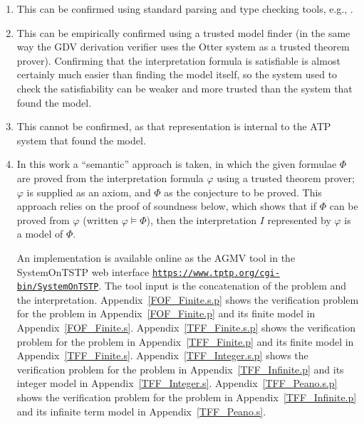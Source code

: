 \documentclass{easychair}
\newcommand{\smalltt}[1]{\small \texttt{#1}}
\begin{document}
\begin{enumerate}
\item This can be confirmed using standard parsing and type checking tools, e.g., \cite{VS06,HR15}.
\item This can be empirically confirmed using a trusted model finder (in the same way the GDV 
      derivation verifier \cite{Sut06} uses the Otter system \cite{McC03-Otter} as a trusted 
      theorem prover).
      Confirming that the interpretation formula is satisfiable is almost certainly much 
      easier than finding the model itself, so the system used to check the satisfiability can 
      be weaker and more trusted than the system that found the model.
\item This cannot be confirmed, as that representation is internal to the ATP system that found
      the model.
\item In this work a ``semantic'' approach is taken, in which the given formulae $\Phi$ are proved 
      from the interpretation formula $\varphi$ using a trusted theorem prover; $\varphi$ is 
      supplied as an axiom, and $\Phi$ as the conjecture to be proved.
      This approach relies on the proof of soundness below, which shows that if $\Phi$ can be 
      proved from $\varphi$ (written $\varphi \models \Phi$), then the interpretation $I$ 
      represented by $\varphi$ is a model of $\Phi$.

      An implementation is available online as the AGMV tool in the SystemOnTSTP \cite{Sut07-CSR} 
      web interface {\smalltt{\url{https://www.tptp.org/cgi-bin/SystemOnTSTP}}}.
      The tool input is the concatenation of the problem and the interpretation.
      Appendix~\ref{FOF_Finite.s.p} shows the verification problem for the problem in 
      Appendix~\ref{FOF_Finite.p} and its finite model in Appendix~\ref{FOF_Finite.s}.
      Appendix~\ref{TFF_Finite.s.p} shows the verification problem for the problem in 
      Appendix~\ref{TFF_Finite.p} and its finite model in Appendix~\ref{TFF_Finite.s}.
      Appendix~\ref{TFF_Integer.s.p} shows the verification problem for the problem in 
      Appendix~\ref{TFF_Infinite.p} and its integer model in Appendix~\ref{TFF_Integer.s}.
      Appendix~\ref{TFF_Peano.s.p} shows the verification problem for the problem in 
      Appendix~\ref{TFF_Infinite.p} and its infinite term model in Appendix~\ref{TFF_Peano.s}.
\end{enumerate}

\end{document}
